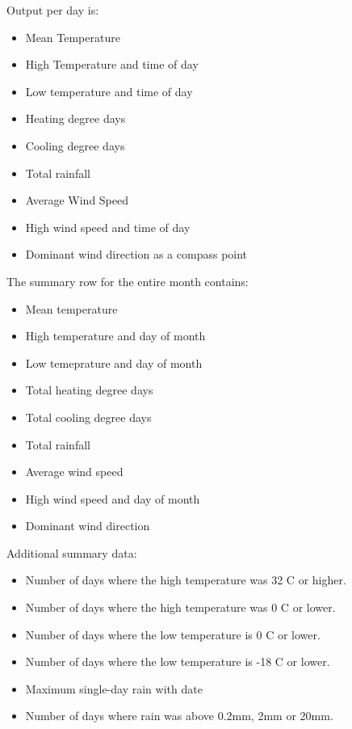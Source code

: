 \documentclass[a4paper,10pt]{book}
\begin{document}
Output per day is:
\begin{itemize}
\item Mean Temperature
\item High Temperature and time of day
\item Low temperature and time of day
\item Heating degree days
\item Cooling degree days
\item Total rainfall
\item Average Wind Speed
\item High wind speed and time of day
\item Dominant wind direction as a compass point
\end{itemize}

The summary row for the entire month contains:
\begin{itemize}
\item Mean temperature
\item High temperature and day of month
\item Low temeprature and day of month
\item Total heating degree days
\item Total cooling degree days
\item Total rainfall
\item Average wind speed
\item High wind speed and day of month
\item Dominant wind direction
\end{itemize}

Additional summary data:
\begin{itemize}
\item Number of days where the high temperature was 32 \degree C or higher.
\item Number of days where the high temperature was 0 \degree C or lower.
\item Number of days where the low temperature is 0 \degree C or lower.
\item Number of days where the low temperature is -18 \degree C or lower.
\item Maximum single-day rain with date
\item Number of days where rain was above 0.2mm, 2mm or 20mm.
\end{itemize}
\end{document}
